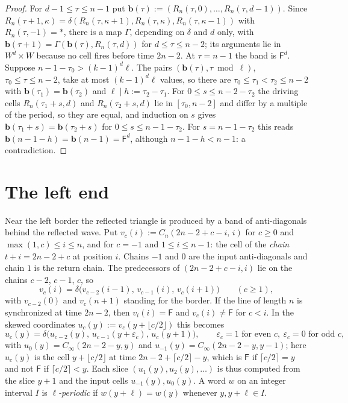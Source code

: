 \documentclass[3p]{elsarticle}
\theoremstyle{definition}
\newcommand{\Fq}{\mathsf F}
\begin{document}
\begin{proof}
For $d-1\le\tau\le n-1$ put $\mathbf b(\tau):=(R_n(\tau,0),\dots,R_n(\tau,d-1))$.
Since $R_n(\tau+1,\kappa)=\delta(R_n(\tau,\kappa+1),R_n(\tau,\kappa),
R_n(\tau,\kappa-1))$ with $R_n(\tau,-1)=\ast$, there is a map $\Gamma$,
depending on $\delta$ and $d$ only, with $\mathbf b(\tau+1)=\Gamma(\mathbf
b(\tau),R_n(\tau,d))$ for $d\le\tau\le n-2$; its arguments lie in $W^d\times
W$ because no cell fires before time $2n-2$. At $\tau=n-1$ the band is
$\Fq^d$. Suppose $n-1-\tau_0>(k-1)^d\ell$. The pairs $(\mathbf
b(\tau),\tau\bmod\ell)$, $\tau_0\le\tau\le n-2$, take at most $(k-1)^d\ell$
values, so there are $\tau_0\le\tau_1<\tau_2\le n-2$ with $\mathbf
b(\tau_1)=\mathbf b(\tau_2)$ and $\ell\mid h:=\tau_2-\tau_1$. For $0\le s\le
n-2-\tau_2$ the driving cells $R_n(\tau_1+s,d)$ and $R_n(\tau_2+s,d)$ lie in
$[\tau_0,n-2]$ and differ by a multiple of the period, so they are equal, and
induction on $s$ gives $\mathbf b(\tau_1+s)=\mathbf b(\tau_2+s)$ for $0\le
s\le n-1-\tau_2$. For $s=n-1-\tau_2$ this reads $\mathbf b(n-1-h)=\mathbf
b(n-1)=\Fq^d$, although $n-1-h<n-1$: a contradiction.
\end{proof}

\section{The left end}\label{sec:left}

Near the left border the reflected triangle is produced by a band of
anti-diagonals behind the reflected wave. Put $v_c(i):=C_n(2n-2+c-i,\,i)$ for
$c\ge0$ and $\max(1,c)\le i\le n$, and for $c=-1$ and $1\le i\le n-1$: the cell
of the \emph{chain} $t+i=2n-2+c$ at position $i$. Chains $-1$ and $0$ are the
input anti-diagonals and chain $1$ is the return chain. The predecessors of
$(2n-2+c-i,i)$ lie on the chains $c-2$, $c-1$, $c$, so
\begin{equation}\label{eq:chains}
v_c(i)=\delta\bigl(v_{c-2}(i-1),\,v_{c-1}(i),\,v_c(i+1)\bigr)\qquad(c\ge1),
\end{equation}
with $v_{c-2}(0)$ and $v_c(n+1)$ standing for the border. If the line of
length $n$ is synchronized at time $2n-2$, then $v_i(i)=\Fq$ and $v_c(i)\ne\Fq$
for $c<i$. In the skewed coordinates $u_c(y):=v_c(y+\lfloor c/2\rfloor)$ this
becomes
\begin{equation}\label{eq:slices}
u_c(y)=\delta\bigl(u_{c-2}(y),\,u_{c-1}(y+\varepsilon_c),\,u_c(y+1)\bigr),
\qquad \varepsilon_c=1\text{ for even }c,\ \varepsilon_c=0\text{ for odd }c,
\end{equation}
with $u_0(y)=C_\infty(2n-2-y,y)$ and $u_{-1}(y)=C_\infty(2n-2-y,y-1)$; here
$u_c(y)$ is the cell $y+\lfloor c/2\rfloor$ at time
$2n-2+\lceil c/2\rceil-y$, which is $\Fq$ if $\lceil c/2\rceil=y$ and not $\Fq$
if $\lceil c/2\rceil<y$. Each slice $(u_1(y),u_2(y),\dots)$ is thus computed
from the slice $y+1$ and the input cells $u_{-1}(y),u_0(y)$. A word $w$ on an
integer interval $I$ is \emph{$\ell$-periodic} if $w(y+\ell)=w(y)$ whenever
$y,y+\ell\in I$.
\end{document}
